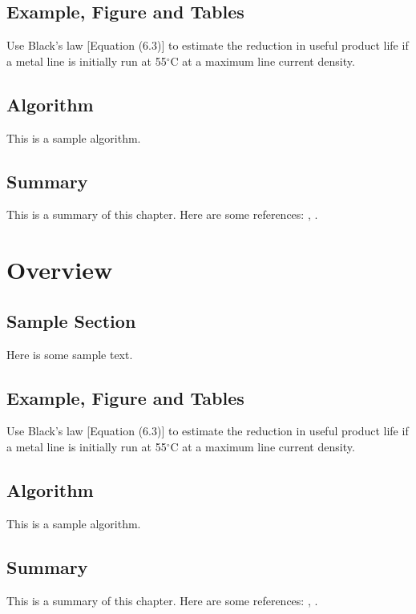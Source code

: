 \documentclass{wileySix}
\begin{document}
\section{Example, Figure and Tables}
\vskip6pt
\begin{example}
	Use Black's law [Equation (6.3)] to estimate the reduction in useful product
	life if a metal line is initially run at 55$^\circ$C at a maximum line
	current density.
\end{example}

\section{Algorithm}
This is a sample algorithm.

\section{Summary}
This is a summary of this chapter.
Here are some references: \cite{xkilby}, \cite{xberen}.

\chapter{Overview}

\section{Sample Section}
Here is some sample text.

\section{Example, Figure and Tables}
\vskip6pt
\begin{example}
	Use Black's law [Equation (6.3)] to estimate the reduction in useful product
	life if a metal line is initially run at 55$^\circ$C at a maximum line
	current density.
\end{example}

\section{Algorithm}
This is a sample algorithm.

\section{Summary}
This is a summary of this chapter.
Here are some references: \cite{xkilby}, \cite{xberen}.
\end{document}
